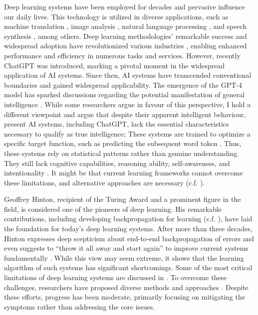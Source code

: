 Deep learning systems have been employed for decades \cite{ivakhnenko_cybernetic_1965} and pervasive influence our daily lives. This technology is utilized in diverse applications, such as machine translation \cite{dabre_survey_2021}, image analysis \cite{bhatt_cnn_2021}, natural language processing \cite{otter_survey_2021}, and speech synthesis \cite{ning_review_2019}, among others. Deep learning methodologies' remarkable success and widespread adoption have revolutionized various industries \cite{bertolini_machine_2021}, enabling enhanced performance and efficiency in numerous tasks and services.
However, recently ChatGPT \cite{liu_summary_2023} was introduced, marking a pivotal moment in the widespread application of AI systems.
Since then, AI systems have transcended conventional boundaries and gained widespread applicability. The emergence of the GPT-4 model \cite{openai_gpt-4_2023} has sparked discussions regarding the potential manifestation of general intelligence \cite{bubeck_sparks_2023}. While some researchers argue in favour of this perspective, I hold a different viewpoint and argue that despite their apparent intelligent behaviour, present AI systems, including ChatGPT, lack the essential characteristics necessary to qualify as true intelligence;
These systems are trained to optimize a specific target function, such as predicting the subsequent word token . Thus, these systems rely on statistical patterns rather than genuine understanding. They still lack cognitive capabilities, reasoning ability, self-awareness, and intentionality . It might be that current learning frameworks cannot overcome these limitations, and alternative approaches are necessary (c.f. ).

Geoffrey Hinton, recipient of the Turing Award and a prominent figure in the field, is considered one of the pioneers of deep learning.
His remarkable contributions, including developing backpropagation for learning (c.f. ), have laid the foundation for today's deep learning systems.
After more than three decades, Hinton expresses deep scepticism about end-to-end backpropagation of errors and even suggests to ``throw it all away and start again'' to improve current systems fundamentally \cite{axios_hinton}.
While this view may seem extreme, it shows that the learning algorithm of such systems has significant shortcomings.
Some of the most critical limitations of deep learning systems are discussed in .
To overcome these challenges, researchers have proposed diverse methods and approaches \cite{long_survey_2022, sager_unsupervised_2022, yarats_improving_2021}. Despite these efforts, progress has been moderate, primarily focusing on mitigating the symptoms rather than addressing the core issues.

